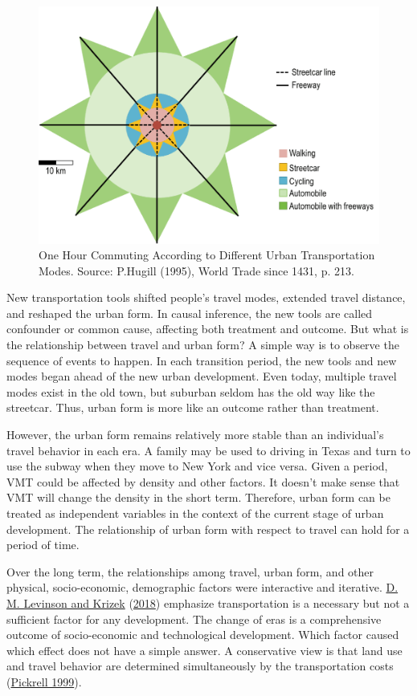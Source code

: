 \documentclass[
  11pt,
  openany]{memoir}
\begin{document}
\begin{figure}

{\centering \includegraphics[width=0.5\linewidth]{fig/one_hour_commmuting2} 

}

\caption{One Hour Commuting According to Different Urban Transportation Modes. Source: P.Hugill (1995), World Trade since 1431, p. 213.}\label{fig:4age}
\end{figure}

New transportation tools shifted people's travel modes, extended travel distance, and reshaped the urban form. In causal inference, the new tools are called confounder or common cause, affecting both treatment and outcome. But what is the relationship between travel and urban form? A simple way is to observe the sequence of events to happen. In each transition period, the new tools and new modes began ahead of the new urban development. Even today, multiple travel modes exist in the old town, but suburban seldom has the old way like the streetcar. Thus, urban form is more like an outcome rather than treatment.

However, the urban form remains relatively more stable than an individual's travel behavior in each era. A family may be used to driving in Texas and turn to use the subway when they move to New York and vice versa. Given a period, VMT could be affected by density and other factors. It doesn't make sense that VMT will change the density in the short term. Therefore, urban form can be treated as independent variables in the context of the current stage of urban development. The relationship of urban form with respect to travel can hold for a period of time.

Over the long term, the relationships among travel, urban form, and other physical, socio-economic, demographic factors were interactive and iterative. \protect\hyperlink{ref-levinsonMetropolitanTransportLand2018}{D. M. Levinson and Krizek} (\protect\hyperlink{ref-levinsonMetropolitanTransportLand2018}{2018}) emphasize transportation is a necessary but not a sufficient factor for any development. The change of eras is a comprehensive outcome of socio-economic and technological development. Which factor caused which effect does not have a simple answer. A conservative view is that land use and travel behavior are determined simultaneously by the transportation costs (\protect\hyperlink{ref-pickrellTRANSPORTATIONLANDUSE1999}{Pickrell 1999}).
\end{document}
